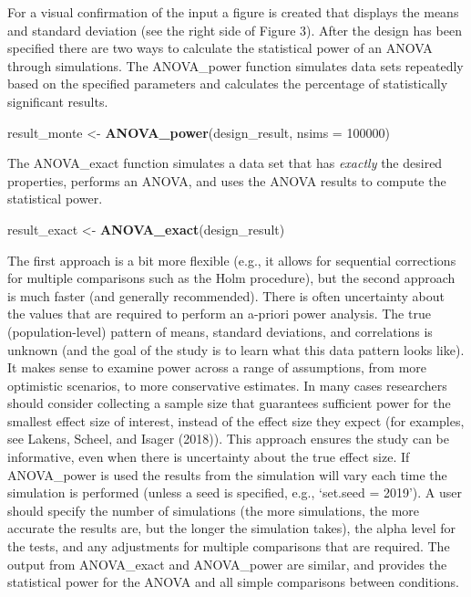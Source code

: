 \documentclass[
  ,jou,floatsintext]{apa6}
\newenvironment{Shaded}{\begin{snugshade}}{\end{snugshade}}
\newcommand{\DataTypeTok}[1]{\textcolor[rgb]{0.13,0.29,0.53}{#1}}
\newcommand{\DecValTok}[1]{\textcolor[rgb]{0.00,0.00,0.81}{#1}}
\newcommand{\KeywordTok}[1]{\textcolor[rgb]{0.13,0.29,0.53}{\textbf{#1}}}
\newcommand{\NormalTok}[1]{#1}
\newcommand{\StringTok}[1]{\textcolor[rgb]{0.31,0.60,0.02}{#1}}
\begin{document}
For a visual confirmation of the input a figure is created that displays the means and standard deviation (see the right side of Figure 3).
After the design has been specified there are two ways to calculate the statistical power of an ANOVA through simulations.
The ANOVA\_power function simulates data sets repeatedly based on the specified parameters and calculates the percentage of statistically significant results.

\begin{Shaded}
\begin{Highlighting}[]
\NormalTok{result_monte <-}\StringTok{ }\KeywordTok{ANOVA_power}\NormalTok{(design_result, }
                            \DataTypeTok{nsims =} \DecValTok{100000}\NormalTok{)}
\end{Highlighting}
\end{Shaded}

The ANOVA\_exact function simulates a data set that has \emph{exactly} the desired properties, performs an ANOVA, and uses the ANOVA results to compute the statistical power.

\begin{Shaded}
\begin{Highlighting}[]
\NormalTok{result_exact <-}\StringTok{ }\KeywordTok{ANOVA_exact}\NormalTok{(design_result)}
\end{Highlighting}
\end{Shaded}

The first approach is a bit more flexible (e.g., it allows for sequential corrections for multiple comparisons such as the Holm procedure), but the second approach is much faster (and generally recommended).
There is often uncertainty about the values that are required to perform an a-priori power analysis.
The true (population-level) pattern of means, standard deviations, and correlations is unknown (and the goal of the study is to learn what this data pattern looks like).
It makes sense to examine power across a range of assumptions, from more optimistic scenarios, to more conservative estimates.
In many cases researchers should consider collecting a sample size that guarantees sufficient power for the smallest effect size of interest, instead of the effect size they expect (for examples, see Lakens, Scheel, and Isager (2018)).
This approach ensures the study can be informative, even when there is uncertainty about the true effect size.
If ANOVA\_power is used the results from the simulation will vary each time the simulation is performed (unless a seed is specified, e.g., `set.seed = 2019').
A user should specify the number of simulations (the more simulations, the more accurate the results are, but the longer the simulation takes), the alpha level for the tests, and any adjustments for multiple comparisons that are required.
The output from ANOVA\_exact and ANOVA\_power are similar, and provides the statistical power for the ANOVA and all simple comparisons between conditions.
\end{document}
